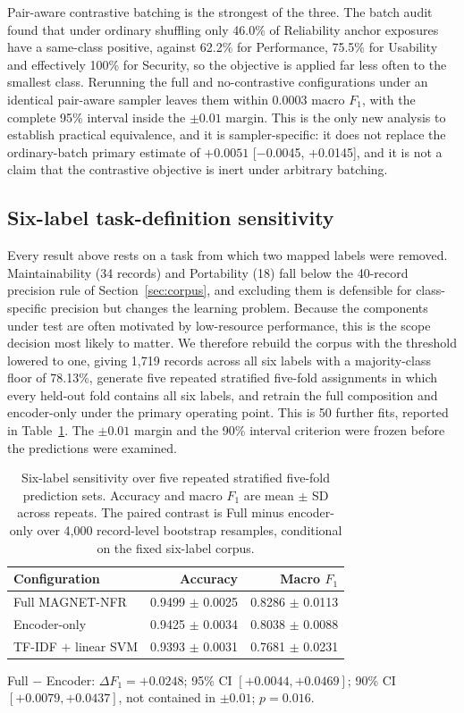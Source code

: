 \documentclass[11pt,a4paper]{article}
\begin{document}
Pair-aware contrastive batching is the strongest of the three. The batch audit found that under ordinary
shuffling only 46.0\% of Reliability anchor exposures have a same-class positive, against 62.2\% for
Performance, 75.5\% for Usability and effectively 100\% for Security, so the objective is applied far less
often to the smallest class. Rerunning the full and no-contrastive configurations under an identical
pair-aware sampler leaves them within 0.0003 macro $F_1$, with the complete 95\% interval inside the
$\pm 0.01$ margin. This is the only new analysis to establish practical equivalence, and it is
sampler-specific: it does not replace the ordinary-batch primary estimate of $+0.0051$
[$-$0.0045, $+$0.0145], and it is not a claim that the contrastive objective is inert under arbitrary
batching.

\subsection{Six-label task-definition sensitivity}
\label{sec:sixlabel}

Every result above rests on a task from which two mapped labels were removed. Maintainability (34 records)
and Portability (18) fall below the 40-record precision rule of Section~\ref{sec:corpus}, and excluding
them is defensible for class-specific precision but changes the learning problem. Because the components
under test are often motivated by low-resource performance, this is the scope decision most likely to
matter. We therefore rebuild the corpus with the threshold lowered to one, giving 1,719 records across all
six labels with a majority-class floor of 78.13\%, generate five repeated stratified five-fold assignments
in which every held-out fold contains all six labels, and retrain the full composition and encoder-only
under the primary operating point. This is 50 further fits, reported in Table~\ref{tab:sixlabel}. The $\pm 0.01$ margin and the 90\%
interval criterion were frozen before the predictions were examined.

\begin{table}[htbp]
\centering
\caption{Six-label sensitivity over five repeated stratified five-fold prediction sets. Accuracy and macro
$F_1$ are mean $\pm$ SD across repeats. The paired contrast is Full minus encoder-only over 4,000
record-level bootstrap resamples, conditional on the fixed six-label corpus.}
\label{tab:sixlabel}
\small
\begin{tabular}{@{}lrr@{}}
\toprule
\textbf{Configuration} & \textbf{Accuracy} & \textbf{Macro $F_1$}\\
\midrule
Full MAGNET-NFR & 0.9499 $\pm$ 0.0025 & 0.8286 $\pm$ 0.0113\\
Encoder-only & 0.9425 $\pm$ 0.0034 & 0.8038 $\pm$ 0.0088\\
TF-IDF $+$ linear SVM & 0.9393 $\pm$ 0.0031 & 0.7681 $\pm$ 0.0231\\
\bottomrule
\end{tabular}

\smallskip
{\small Full $-$ Encoder: $\Delta F_1 = +0.0248$; 95\% CI $[+0.0044, +0.0469]$; 90\% CI
$[+0.0079, +0.0437]$, not contained in $\pm 0.01$; $p = 0.016$.}
\end{table}
\end{document}
